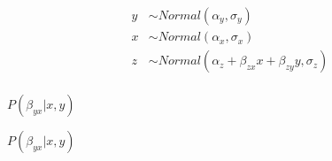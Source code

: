 \documentclass[10pt]{book}
\begin{document}
\begin{mdSnippets}
\begin{mdDisplaySnippet}
\[%
\begin{aligned} 
y &\sim Normal(\alpha_y, \sigma_y) \\
x &\sim Normal(\alpha_x, \sigma_x) \\
z &\sim Normal(\alpha_z + \beta_{zx}x + \beta_{zy}y, \sigma_z) \\
\end{aligned}
\]%
\end{mdDisplaySnippet}%
\begin{mdInlineSnippet}[6f1aa4adb6f08434c5a5404ae8a42c8a]%
{$P(\beta_{yx}|x, y)$}\end{mdInlineSnippet}%
\begin{mdInlineSnippet}[6f1aa4adb6f08434c5a5404ae8a42c8a]%
{$P(\beta_{yx}|x, y)$}\end{mdInlineSnippet}%

\end{mdSnippets}
\end{document}

